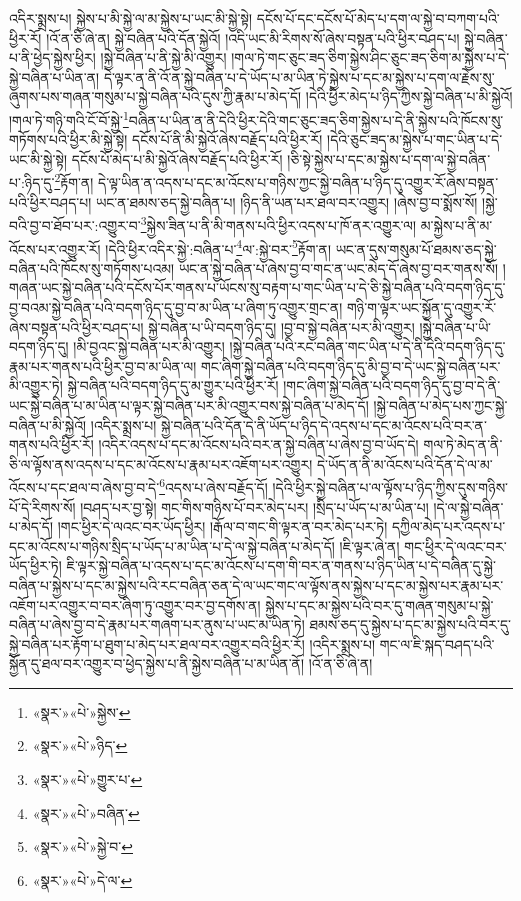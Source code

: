 འདིར་སྨྲས་པ། སྐྱེས་པ་མི་སྐྱེ་ལ་མ་སྐྱེས་པ་ཡང་མི་སྐྱེ་སྟེ། དངོས་པོ་དང་དངོས་པོ་མེད་པ་དག་ལ་སྐྱེ་བ་བཀག་པའི་ཕྱིར་རོ། །འོ་ན་ཅི་ཞེ་ན། སྐྱེ་བཞིན་པའི་དོན་སྐྱེའོ། །འདི་ཡང་མི་རིགས་སོ་ཞེས་བསྟན་པའི་ཕྱིར་བཤད་པ། སྐྱེ་བཞིན་པ་ནི་ཕྱེད་སྐྱེས་ཕྱིར། །སྐྱེ་བཞིན་པ་ནི་སྐྱེ་མི་འགྱུར། །གལ་ཏེ་གང་ཅུང་ཟད་ཅིག་སྐྱེས་ཤིང་ཅུང་ཟད་ཅིག་མ་སྐྱེས་པ་དེ་སྐྱེ་བཞིན་པ་ཡིན་ན། དེ་ལྟར་ན་ནི་འོ་ན་སྐྱེ་བཞིན་པ་དེ་ཡོད་པ་མ་ཡིན་ཏེ་སྐྱེས་པ་དང་མ་སྐྱེས་པ་དག་ལ་རྗེས་སུ་ཞུགས་པས་གཞན་གསུམ་པ་སྐྱེ་བཞིན་པའི་དུས་ཀྱི་རྣམ་པ་མེད་དོ། །དེའི་ཕྱིར་མེད་པ་ཉིད་ཀྱིས་སྐྱེ་བཞིན་པ་མི་སྐྱེའོ། །གལ་ཏེ་གཉི་གའི་ངོ་བོ་སྐྱེ་\footnote{«སྣར་»«པེ་»སྐྱེས་}བཞིན་པ་ཡིན་ན་ནི་དེའི་ཕྱིར་དེའི་གང་ཅུང་ཟད་ཅིག་སྐྱེས་པ་དེ་ནི་སྐྱེས་པའི་ཁོངས་སུ་གཏོགས་པའི་ཕྱིར་མི་སྐྱེ་སྟེ། དངོས་པོ་ནི་མི་སྐྱེའོ་ཞེས་བརྗོད་པའི་ཕྱིར་རོ། །དེའི་ཅུང་ཟད་མ་སྐྱེས་པ་གང་ཡིན་པ་དེ་ཡང་མི་སྐྱེ་སྟེ། དངོས་པོ་མེད་པ་མི་སྐྱེའོ་ཞེས་བརྗོད་པའི་ཕྱིར་རོ། །ཅི་སྟེ་སྐྱེས་པ་དང་མ་སྐྱེས་པ་དག་ལ་སྐྱེ་བཞིན་པ་:ཉིད་དུ་\footnote{«སྣར་»«པེ་»ཉིད་}རྟོག་ན། དེ་ལྟ་ཡིན་ན་འདས་པ་དང་མ་འོངས་པ་གཉིས་ཀྱང་སྐྱེ་བཞིན་པ་ཉིད་དུ་འགྱུར་རོ་ཞེས་བསྟན་པའི་ཕྱིར་བཤད་པ། ཡང་ན་ཐམས་ཅད་སྐྱེ་བཞིན་པ། །ཉིད་ནི་ཡན་པར་ཐལ་བར་འགྱུར། །ཞེས་བྱ་བ་སྨོས་སོ། །སྐྱེ་བའི་བྱ་བ་ཐོབ་པར་:འགྱུར་བ་\footnote{«སྣར་»«པེ་»གྱུར་པ་}སྐྱེས་ཟིན་པ་ནི་མི་གནས་པའི་ཕྱིར་འདས་པ་ཁོ་ནར་འགྱུར་ལ། མ་སྐྱེས་པ་ནི་མ་འོངས་པར་འགྱུར་རོ། །དེའི་ཕྱིར་འདིར་སྐྱེ་:བཞིན་པ་\footnote{«སྣར་»«པེ་»བཞིན་}ལ་:སྐྱེ་བར་\footnote{«སྣར་»«པེ་»སྐྱེ་བ་}རྟོག་ན། ཡང་ན་དུས་གསུམ་པོ་ཐམས་ཅད་སྐྱེ་བཞིན་པའི་ཁོངས་སུ་གཏོགས་པའམ། ཡང་ན་སྐྱེ་བཞིན་པ་ཞེས་བྱ་བ་གང་ན་ཡང་མེད་དོ་ཞེས་བྱ་བར་གནས་སོ། །གཞན་ཡང་སྐྱེ་བཞིན་པའི་དངོས་པོར་གནས་པ་ཡོངས་སུ་བརྟག་པ་གང་ཡིན་པ་དེ་ཅི་སྐྱེ་བཞིན་པའི་བདག་ཉིད་དུ་བྱ་བའམ་སྐྱེ་བཞིན་པའི་བདག་ཉིད་དུ་བྱ་བ་མ་ཡིན་པ་ཞིག་ཏུ་འགྱུར་གྲང་ན། གཉི་ག་ལྟར་ཡང་སྐྱོན་དུ་འགྱུར་རོ་ཞེས་བསྟན་པའི་ཕྱིར་བཤད་པ། སྐྱེ་བཞིན་པ་ཡི་བདག་ཉིད་དུ། །བྱ་བ་སྐྱེ་བཞིན་པར་མི་འགྱུར། །སྐྱེ་བཞིན་པ་ཡི་བདག་ཉིད་དུ། །མི་བྱའང་སྐྱེ་བཞིན་པར་མི་འགྱུར། །སྐྱེ་བཞིན་པའི་རང་བཞིན་གང་ཡིན་པ་དེ་ནི་དེའི་བདག་ཉིད་དུ་རྣམ་པར་གནས་པའི་ཕྱིར་བྱ་བ་མ་ཡིན་ལ། གང་ཞིག་སྐྱེ་བཞིན་པའི་བདག་ཉིད་དུ་མི་བྱ་བ་དེ་ཡང་སྐྱེ་བཞིན་པར་མི་འགྱུར་ཏེ། སྐྱེ་བཞིན་པའི་བདག་ཉིད་དུ་མ་གྱུར་པའི་ཕྱིར་རོ། །གང་ཞིག་སྐྱེ་བཞིན་པའི་བདག་ཉིད་དུ་བྱ་བ་དེ་ནི་ཡང་སྐྱེ་བཞིན་པ་མ་ཡིན་པ་ལྟར་སྐྱེ་བཞིན་པར་མི་འགྱུར་བས་སྐྱེ་བཞིན་པ་མེད་དོ། །སྐྱེ་བཞིན་པ་མེད་པས་ཀྱང་སྐྱེ་བཞིན་པ་མི་སྐྱེའོ། །འདིར་སྨྲས་པ། སྐྱེ་བཞིན་པའི་དོན་དེ་ནི་ཡོད་པ་ཉིད་དེ་འདས་པ་དང་མ་འོངས་པའི་བར་ན་གནས་པའི་ཕྱིར་རོ། །འདིར་འདས་པ་དང་མ་འོངས་པའི་བར་ན་སྐྱེ་བཞིན་པ་ཞེས་བྱ་བ་ཡོད་དེ། གལ་ཏེ་མེད་ན་ནི་ཅི་ལ་ལྟོས་ནས་འདས་པ་དང་མ་འོངས་པ་རྣམ་པར་འཇོག་པར་འགྱུར། དེ་ཡོད་ན་ནི་མ་འོངས་པའི་དོན་དེ་ལ་མ་འོངས་པ་དང་ཐལ་བ་ཞེས་བྱ་བ་དེ་\footnote{«སྣར་»«པེ་»དེ་ལ་}འདས་པ་ཞེས་བརྗོད་དོ། །དེའི་ཕྱིར་སྐྱེ་བཞིན་པ་ལ་ལྟོས་པ་ཉིད་ཀྱིས་དུས་གཉིས་པོ་དེ་རིགས་སོ། །བཤད་པར་བྱ་སྟེ། གང་གིས་གཉིས་པོ་བར་མེད་པར། །སྲིད་པ་ཡོད་པ་མ་ཡིན་པ། །དེ་ལ་སྐྱེ་བཞིན་པ་མེད་དོ། །གང་ཕྱིར་དེ་ལའང་བར་ཡོད་ཕྱིར། །རྒོལ་བ་གང་གི་ལྟར་ན་བར་མེད་པར་ཏེ། དཀྱིལ་མེད་པར་འདས་པ་དང་མ་འོངས་པ་གཉིས་སྲིད་པ་ཡོད་པ་མ་ཡིན་པ་དེ་ལ་སྐྱེ་བཞིན་པ་མེད་དོ། །ཇི་ལྟར་ཞེ་ན། གང་ཕྱིར་དེ་ལའང་བར་ཡོད་ཕྱིར་ཏེ། ཇི་ལྟར་སྐྱེ་བཞིན་པ་འདས་པ་དང་མ་འོངས་པ་དག་གི་བར་ན་གནས་པ་ཉིད་ཡིན་པ་དེ་བཞིན་དུ་སྐྱེ་བཞིན་པ་སྐྱེས་པ་དང་མ་སྐྱེས་པའི་རང་བཞིན་ཅན་དེ་ལ་ཡང་གང་ལ་ལྟོས་ནས་སྐྱེས་པ་དང་མ་སྐྱེས་པར་རྣམ་པར་འཇོག་པར་འགྱུར་བ་བར་ཞིག་ཏུ་འགྱུར་བར་བྱ་དགོས་ན། སྐྱེས་པ་དང་མ་སྐྱེས་པའི་བར་དུ་གཞན་གསུམ་པ་སྐྱེ་བཞིན་པ་ཞེས་བྱ་བ་དེ་རྣམ་པར་གཞག་པར་ནུས་པ་ཡང་མ་ཡིན་ཏེ། ཐམས་ཅད་དུ་སྐྱེས་པ་དང་མ་སྐྱེས་པའི་བར་དུ་སྐྱེ་བཞིན་པར་རྟོག་པ་ཐུག་པ་མེད་པར་ཐལ་བར་འགྱུར་བའི་ཕྱིར་རོ། །འདིར་སྨྲས་པ། གང་ལ་ཇི་སྐད་བཤད་པའི་སྐྱོན་དུ་ཐལ་བར་འགྱུར་བ་ཕྱེད་སྐྱེས་པ་ནི་སྐྱེས་བཞིན་པ་མ་ཡིན་ནོ། །འོ་ན་ཅི་ཞེ་ན། 